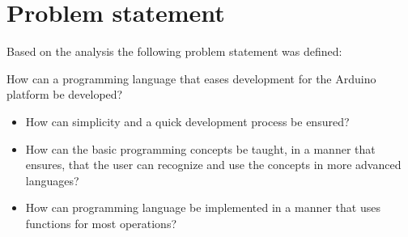 \section{Problem statement}
Based on the analysis the following problem statement was defined:
\begin{center}
	How can a programming language that eases development for the Arduino platform be developed?

\begin{itemize}
	\item How can simplicity and a quick development process be ensured? %
	\item How can the basic programming concepts be taught, in a manner that ensures, that the user can recognize and use the concepts in more advanced languages?
	\item How can programming language be implemented in a manner that uses functions for most operations? 
\end{itemize}
\end{center}
